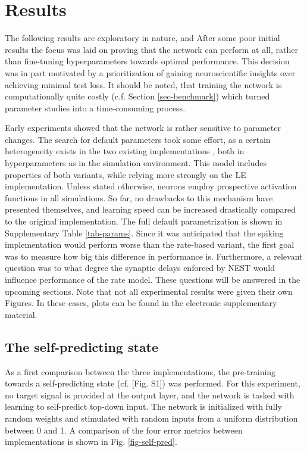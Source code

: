 
\chapter{Results}

The following results are exploratory in nature, and After some poor initial results the focus was laid on proving that
the network can perform at all, rather than fine-tuning hyperparameters towards optimal performance. This decision was
in part motivated by a prioritization of gaining neuroscientific insights over achieving minimal test loss. It should be
noted, that training the network is computationally quite costly (c.f. Section \ref{sec-benchmark}) which turned
parameter studies into a time-consuming process.

Early experiments showed that the network is rather sensitive to parameter changes. The search for default parameters
took some effort, as a certain heterogeneity exists in the two existing implementations
\citep{sacramento2018dendritic,Haider2021}, both in hyperparameters as in the simulation environment. This model
includes properties of both variants, while relying more strongly on the LE implementation. Unless stated otherwise,
neurons employ prospective activation functions in all simulations. So far, no drawbacks to this mechanism have
presented themselves, and learning speed can be increased drastically compared to the original implementation. The full
default parametrization is shown in Supplementary Table \ref{tab-params}. Since it was anticipated that the spiking
implementation would perform worse than the rate-based variant, the first goal was to measure how big this difference in
performance is. Furthermore, a relevant question was to what degree the synaptic delays enforced by NEST would influence
performance of the rate model. These questions will be answered in the upcoming sections. Note that not all experimental
results were given their own Figures. In these cases, plots can be found in the electronic supplementary material.


\section{The self-predicting state}

As a first comparison between the three implementations, the pre-training towards a self-predicting state (cf.
\citep{sacramento2018dendritic}[Fig. S1]) was performed. For this experiment, no target signal is provided at the output
layer, and the network is tasked with learning to self-predict top-down input. The network is initialized with fully
random weights and stimulated with random inputs from a uniform distribution between 0 and 1. A comparison of the four
error metrics between implementations is shown in Fig. \ref{fig-self-pred}.



